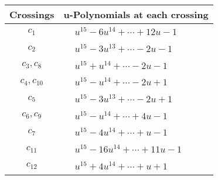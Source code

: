 \documentclass[1p]{elsarticle_modified}
\theoremstyle{definition}
\begin{document}
\begin{tabular}{m{50pt}|m{274pt}}
Crossings & \hspace{64pt}u-Polynomials at each crossing \\
\hline $$\begin{aligned}c_{1}\end{aligned}$$&$\begin{aligned}
&u^{15}-6 u^{14}+\cdots+12 u-1
\end{aligned}$\\
\hline $$\begin{aligned}c_{2}\end{aligned}$$&$\begin{aligned}
&u^{15}-3 u^{13}+\cdots-2 u-1
\end{aligned}$\\
\hline $$\begin{aligned}c_{3},c_{8}\end{aligned}$$&$\begin{aligned}
&u^{15}+u^{14}+\cdots-2 u-1
\end{aligned}$\\
\hline $$\begin{aligned}c_{4},c_{10}\end{aligned}$$&$\begin{aligned}
&u^{15}- u^{14}+\cdots-2 u+1
\end{aligned}$\\
\hline $$\begin{aligned}c_{5}\end{aligned}$$&$\begin{aligned}
&u^{15}-3 u^{13}+\cdots-2 u+1
\end{aligned}$\\
\hline $$\begin{aligned}c_{6},c_{9}\end{aligned}$$&$\begin{aligned}
&u^{15}- u^{14}+\cdots+4 u-1
\end{aligned}$\\
\hline $$\begin{aligned}c_{7}\end{aligned}$$&$\begin{aligned}
&u^{15}-4 u^{14}+\cdots+u-1
\end{aligned}$\\
\hline $$\begin{aligned}c_{11}\end{aligned}$$&$\begin{aligned}
&u^{15}-16 u^{14}+\cdots+11 u-1
\end{aligned}$\\
\hline $$\begin{aligned}c_{12}\end{aligned}$$&$\begin{aligned}
&u^{15}+4 u^{14}+\cdots+u+1
\end{aligned}$\\
\hline
\end{tabular}\\~\\
\end{document}
